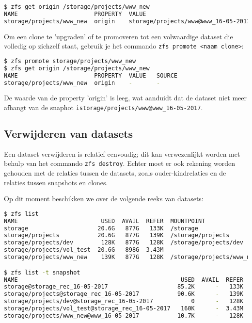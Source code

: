\begin{lstlisting}[language=bash,style=command_style] 
$ zfs get origin /storage/projects/www_new
NAME                      PROPERTY  VALUE                                SOURCE
storage/projects/www_new  origin    storage/projects/www@www_16-05-2017  -
\end{lstlisting}

Om een clone te 'upgraden' of te promoveren tot een volwaardige dataset die volledig op zichzelf staat, gebruik je het commando \texttt{zfs promote <naam clone>}:

\begin{lstlisting}[language=bash,style=command_style] 
$ zfs promote storage/projects/www_new
$ zfs get origin /storage/projects/www_new
NAME                      PROPERTY  VALUE   SOURCE
storage/projects/www_new  origin    -       -
\end{lstlisting}

De waarde van de property 'origin' is leeg, wat aanduidt dat de dataset niet meer afhangt van de snaphot \texttt{istorage/projects/www@www\_16-05-2017}. 

\clearpage

\subsection{Verwijderen van datasets}

Een dataset verwijderen is relatief eenvoudig; dit kan verwezenlijkt worden met behulp van het commando \texttt{zfs destroy}. Echter moet er ook rekening worden gehouden met de relaties tussen de datasets, zoals ouder-kindrelaties en de relaties tussen snapshots en clones.

Op dit moment beschikken we over de volgende reeks van datasets:

\begin{lstlisting}[language=bash,style=command_style] 
$ zfs list
NAME                        USED  AVAIL  REFER  MOUNTPOINT
storage                    20.6G   877G   133K  /storage
storage/projects           20.6G   877G   139K  /storage/projects
storage/projects/dev        128K   877G   128K  /storage/projects/dev
storage/projects/vol_test  20.6G   898G  3.43M  -
storage/projects/www_new    139K   877G   128K  /storage/projects/www_new

$ zfs list -t snapshot
NAME                                               USED  AVAIL  REFER  MOUNTPOINT
storage@storage_rec_16-05-2017                    85.2K      -   133K  -
storage/projects@storage_rec_16-05-2017           90.6K      -   139K  -
storage/projects/dev@storage_rec_16-05-2017           0      -   128K  -
storage/projects/vol_test@storage_rec_16-05-2017   160K      -  3.43M  -
storage/projects/www_new@www_16-05-2017           10.7K      -   128K  -
\end{lstlisting}

